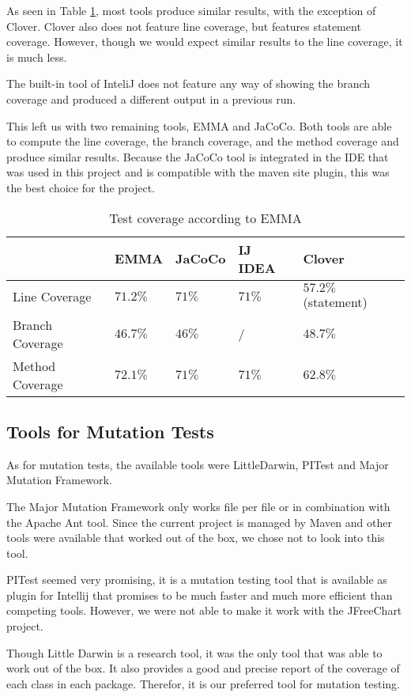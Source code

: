 \documentclass[]{article}
\begin{document}
As seen in Table \ref{testCoverageTools}, most tools produce similar results, with the exception of Clover. Clover also does not feature line coverage, but features statement coverage. However, though we would expect similar results to the line coverage, it is much less.

The built-in tool of InteliJ does not feature any way of showing the branch coverage and produced a different output in a previous run. 

This left us with two remaining tools, EMMA and JaCoCo. Both tools are able to compute the line coverage, the branch coverage, and the method coverage and produce similar results. Because the JaCoCo tool is integrated in the IDE that was used in this project and is compatible with the maven site plugin, this was the best choice for the project. 

\begin{table}[]
	\begin{center}
		\begin{tabular}{|l||l|l|l|l|}
			\hline
			&  EMMA & JaCoCo & IJ IDEA & Clover\\ \hline\hline
			Line Coverage	& $71.2\%$ & $71\%$ & $71\%$ &  $57.2\%$ (statement)\\
			Branch Coverage	& $46.7\%$ & $46\%$ &  / & $48.7\%$\\
			Method Coverage	& $72.1\%$ & $71\%$ & $71\%$& $62.8\%$ \\ 
			\hline
		\end{tabular}
		\caption{Test coverage according to EMMA}
		\label{testCoverageTools}
	\end{center}
	
\end{table}

\subsection{Tools for Mutation Tests}

As for mutation tests, the available tools were LittleDarwin, PITest and Major Mutation Framework. 

The Major Mutation Framework only works file per file or in combination with the Apache Ant tool. Since the current project is managed by Maven and other tools were available that worked out of the box, we chose not to look into this tool. 

PITest seemed very promising, it is a mutation testing tool that is available as plugin for Intellij that promises to be much faster and much more efficient than competing tools. However, we were not able to make it work with the JFreeChart project. 

Though Little Darwin is a research tool, it was the only tool that was able to work out of the box. It also provides a good and precise report of the coverage of each class in each package. Therefor, it is our preferred tool for mutation testing.  
\end{document}
